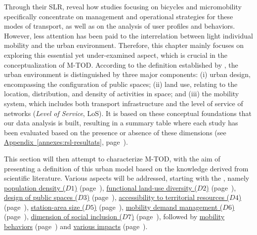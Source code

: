 \begin{refsegment}
Through their \acrshort{SLR}, \textcolor{blue}{\textcite[294]{zhang_built_2023}} reveal how studies focusing on bicycles and micromobility specifically concentrate on management and operational strategies for these modes of transport, as well as on the analysis of user profiles and behaviors. However, less attention has been paid to the interrelation between light individual mobility and the urban environment. Therefore, this chapter mainly focuses on exploring this essential yet under-examined aspect, which is crucial in the conceptualization of \acrshort{M-TOD}. According to the definition established by \textcolor{blue}{\textcite[65]{handy_how_2002}}, the urban environment is distinguished by three major components: (i) urban design, encompassing the configuration of public spaces; (ii) land use, relating to the location, distribution, and density of activities in space; and (iii) the mobility system, which includes both transport infrastructure and the level of service of networks (\textsl{Level of Service}, LoS). It is based on these conceptual foundations that our data analysis is built, resulting in a summary table where each study has been evaluated based on the presence or absence of these dimensions (see \hyperref[annexes:rsl-resultats]{Appendix~\ref{annexes:rsl-resultats}}, page~\pageref{annexes:rsl-resultats}).%

This section will then attempt to characterize \acrshort{M-TOD}, with the aim of presenting a definition of this urban model based on the knowledge derived from scientific literature. Various aspects will be addressed, starting with the , namely \hyperref[chap2:densite-population]{population density (\(D1\))} (page~\pageref{chap2:densite-population}), \hyperref[chap2:diversite-fonctionnelle]{functional land-use diversity (\(D2\))} (page~\pageref{chap2:diversite-fonctionnelle}), \hyperref[chap2:traitement-espaces-publics]{design of public spaces (\(D3\))} (page~\pageref{chap2:traitement-espaces-publics}), \hyperref[chap2:accessibilite-intermodale]{accessibility to territorial resources (\(D4\))} (page~\pageref{chap2:accessibilite-intermodale}), \hyperref[chap2:distances-premiers-derniers-km]{station-area size (\(D5\))} (page~\pageref{chap2:distances-premiers-derniers-km}), \hyperref[chap2:gestion-demande-mobilite]{mobility demand management (\(D6\))} (page~\pageref{chap2:gestion-demande-mobilite}), \hyperref[chap2:sociodemographie-usagers]{dimension of social inclusion (\(D7\))} (page~\pageref{chap2:sociodemographie-usagers}), followed by \hyperref[chap2:comportements-mobilite]{mobility behaviors} (page~\pageref{chap2:comportements-mobilite}) and \hyperref[chap2:impacts-systemes-urbain-mobilite]{various impacts} (page~\pageref{chap2:impacts-systemes-urbain-mobilite}).%


\end{refsegment}
